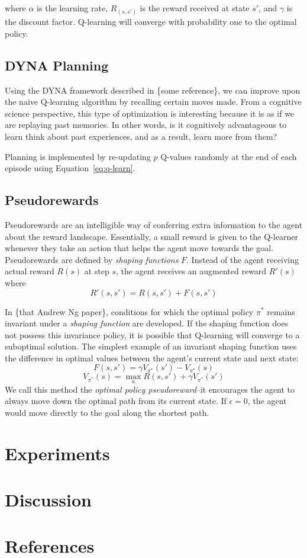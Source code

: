 \documentclass[notitlepage]{report}
\begin{document}
where $\alpha$ is the learning rate, $R_(s, s')$ is the reward received at state $s'$, and $\gamma$ is the discount factor. Q-learning will converge with probability one to the optimal policy. 

\subsection*{DYNA Planning}

Using the DYNA framework described in \{some reference\}, we can improve upon the naive Q-learning algorithm by recalling certain moves made. From a cognitive science perspective, this type of optimization is interesting because it is as if we are replaying past memories. In other words, is it cognitively advantageous to learn think about past experiences, and as a result, learn more from them? 

Planning is implemented by re-updating $p$ Q-values randomly at the end of each episode using Equation~\ref{eq:q-learn}. 

\subsection*{Pseudorewards}

Pseudorewards are an intelligible way of conferring extra information to the agent about the reward landscape. Essentially, a small reward is given to the Q-learner whenever they take an action that helps the agent move towards the goal. Pseudorewards are defined by \textit{shaping functions} $F$. Instead of the agent receiving actual reward $R(s)$ at step $s$, the agent receives an augmented reward $R'(s)$ where
\begin{equation}
R'(s, s') = R(s, s') + F(s, s')
\end{equation} 

 In \{that Andrew Ng paper\}, conditions for which the optimal policy $\pi^*$ remains invariant under a \textit{shaping function} are developed. If the shaping function does not possess this invariance policy, it is possible that Q-learning will converge to a suboptimal solution. The simplest example of an invariant shaping function uses the difference in optimal values between the agent's current state and next state:
\begin{equation}
F(s, s') = \gamma V_{\pi^*}(s') - V_{\pi^*}(s) 
\end{equation}
\begin{equation}
V_{\pi^*}(s) =  \max_{a} R(s, s') + \gamma V_{\pi^*}(s')
\end{equation}
We call this method the \textit{optimal policy pseudoreward}--it encourages the agent to always move down the optimal path from its current state. If $\epsilon = 0$, the agent would move directly to the goal along the shortest path.


\section*{Experiments}



\section*{Discussion}

\section*{References}
\end{document}
